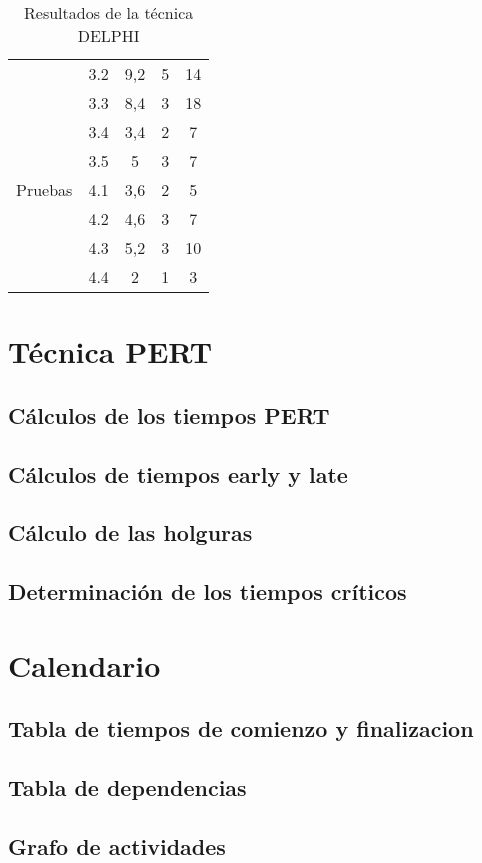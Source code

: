\documentclass[11pt,a4paper,spanish,twoside]{report}
\begin{document}
\begin{table}[!h]
\begin{tabular}{|p{2.5cm}|c|c|c|c|}
    \cline{2-5}
    & 3.2 & 9,2 & 5 & 14\\
    \cline{2-5}
    & 3.3 & 8,4 & 3 & 18\\
    \cline{2-5}
    & 3.4 & 3,4 & 2 & 7\\
    \cline{2-5}
    & 3.5 & 5 & 3 & 7\\
    \hline
    Pruebas & 4.1 & 3,6 & 2 & 5\\
    \cline{2-5}
    & 4.2 & 4,6 & 3 & 7\\
    \cline{2-5}
    & 4.3 & 5,2 & 3 & 10\\
    \cline{2-5}
    & 4.4 & 2 & 1 & 3\\
    \hline
  \end{tabular}
  \caption{Resultados de la técnica DELPHI} \label{Tab:val}
\end{table}
\chapter{Técnica PERT}
\section{Cálculos de los tiempos PERT}
\section{Cálculos de tiempos early y late}
\section{Cálculo de las holguras}
\section{Determinación de los tiempos críticos}

\chapter{Calendario}
\section{Tabla de tiempos de comienzo y finalizacion}
\section{Tabla de dependencias}
\section{Grafo de actividades}


 

\end{document}
